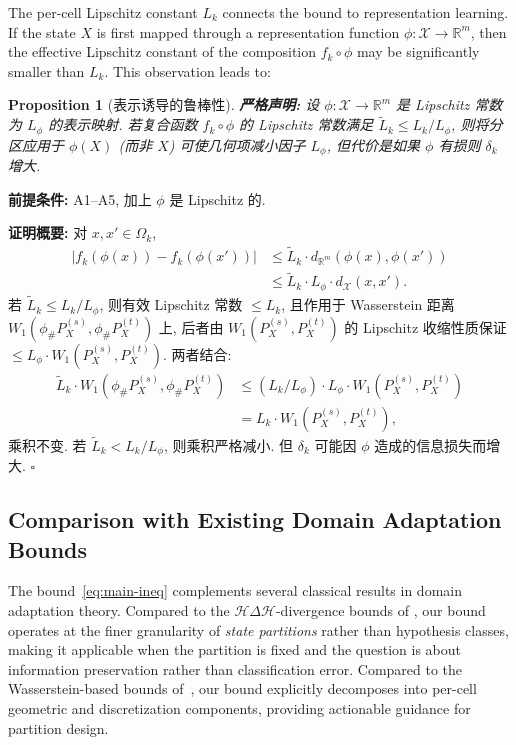 \documentclass[12pt,a4paper]{article}
\newtheorem{proposition}[theorem]{Proposition}
\newcommand{\R}{\mathbb{R}}
\newcommand{\cX}{\mathcal{X}}
\newcommand{\cH}{\mathcal{H}}
\newcommand{\premise}{\textbf{前提条件: }}
\begin{document}
The per-cell Lipschitz constant $L_k$ connects the bound to representation
learning.  If the state $X$ is first mapped through a representation
function $\phi:\cX\to\R^m$, then the effective Lipschitz constant of the
composition $f_k\circ\phi$ may be significantly smaller than $L_k$.
This observation leads to:

\begin{proposition}[表示诱导的鲁棒性]\label{prop:rep-robust}
\textbf{严格声明:}
设 $\phi:\cX\to\R^m$ 是 Lipschitz 常数为 $L_\phi$ 的表示映射.
若复合函数 $f_k\circ\phi$ 的 Lipschitz 常数满足
$\tilde{L}_k \leq L_k/L_\phi$, 则将分区应用于 $\phi(X)$
(而非 $X$) 可使几何项减小因子 $L_\phi$, 但代价是如果
$\phi$ 有损则 $\delta_k$ 增大.
\end{proposition}

\premise A1--A5, 加上 $\phi$ 是 Lipschitz 的.

\medskip\noindent
\textbf{证明概要:}
对 $x,x'\in\Omega_k$,
\begin{align*}
    |f_k(\phi(x))-f_k(\phi(x'))| &\leq \tilde{L}_k\cdot d_{\R^m}(\phi(x),\phi(x'))\\
    &\leq \tilde{L}_k\cdot L_\phi\cdot d_{\cX}(x,x').
\end{align*}
若 $\tilde{L}_k \leq L_k/L_\phi$, 则有效 Lipschitz 常数
$\leq L_k$, 且作用于 Wasserstein 距离
$W_1(\phi_\#P^{(s)}_X,\phi_\#P^{(t)}_X)$ 上, 后者由
$W_1(P^{(s)}_X,P^{(t)}_X)$ 的 Lipschitz 收缩性质保证
$\leq L_\phi\cdot W_1(P^{(s)}_X,P^{(t)}_X)$. 两者结合:
\begin{align*}
    \tilde{L}_k\cdot W_1(\phi_\#P^{(s)}_X,\phi_\#P^{(t)}_X)
    &\leq (L_k/L_\phi)\cdot L_\phi\cdot W_1(P^{(s)}_X,P^{(t)}_X)\\
    &= L_k\cdot W_1(P^{(s)}_X,P^{(t)}_X),
\end{align*}
乘积不变. 若 $\tilde{L}_k < L_k/L_\phi$, 则乘积严格减小.
但 $\delta_k$ 可能因 $\phi$ 造成的信息损失而增大. \hfill $\square$

\subsection{Comparison with Existing Domain Adaptation Bounds}

The bound~\eqref{eq:main-ineq} complements several classical results in
domain adaptation theory.  Compared to the
$\cH\Delta\cH$-divergence bounds of \citet{ben2007analysis}, our bound
operates at the finer granularity of \emph{state partitions} rather than
hypothesis classes, making it applicable when the partition is fixed
and the question is about information preservation rather than
classification error.  Compared to the Wasserstein-based bounds
of~\citet{shen2018wasserstein}, our bound explicitly decomposes into
per-cell geometric and discretization components, providing actionable
guidance for partition design.
\end{document}
